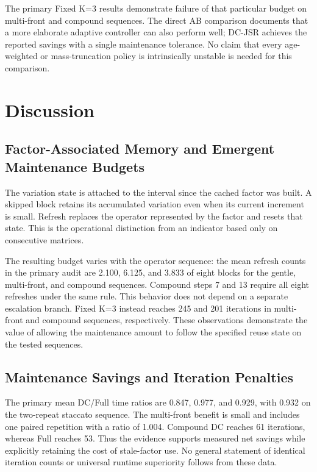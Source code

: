 \documentclass[preprint,12pt,3p]{elsarticle}
\begin{document}
The primary Fixed K=3 results demonstrate failure of that particular budget
on multi-front and compound sequences. The direct AB comparison documents
that a more elaborate adaptive controller can also perform well; DC-JSR
achieves the reported savings with a single maintenance tolerance.
No claim that every age-weighted or mass-truncation policy is intrinsically
unstable is needed for this comparison.

\section{Discussion}
\label{sec:discussion}

\subsection{Factor-Associated Memory and Emergent Maintenance Budgets}
The variation state is attached to the interval since the cached factor was
built. A skipped block retains its accumulated variation even when its current
increment is small. Refresh replaces the operator represented by the factor
and resets that state. This is the operational distinction from an indicator
based only on consecutive matrices.

The resulting budget varies with the operator sequence: the mean refresh
counts in the primary audit are 2.100, 6.125, and 3.833 of eight blocks for the
gentle, multi-front, and compound sequences. Compound steps 7 and 13 require
all eight refreshes under the same rule. This behavior does not depend on a
separate escalation branch. Fixed K=3 instead reaches 245 and 201 iterations
in multi-front and compound sequences, respectively. These observations
demonstrate the value of allowing the maintenance amount to follow the
specified reuse state on the tested sequences.

\subsection{Maintenance Savings and Iteration Penalties}
The primary mean DC/Full time ratios are 0.847, 0.977, and 0.929, with 0.932
on the two-repeat staccato sequence. The multi-front benefit is small and
includes one paired repetition with a ratio of 1.004. Compound DC reaches
61 iterations, whereas Full reaches 53. Thus the evidence supports measured
net savings while explicitly retaining the cost of stale-factor use.
No general statement of identical iteration counts or universal runtime
superiority follows from these data.
\end{document}
